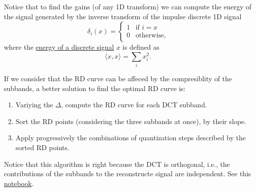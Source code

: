Notice that to find the gains (of any 1D transform) we can compute the
energy of the signal generated by the inverse transform of the impulse
discrete 1D signal
\begin{equation}
  \delta_{i}(x) = 
  \left\{
  \begin{array}{ll}
    1 & \text{if $i=x$}\\
    0 & \text{otherwise},
  \end{array}
  \right.
\end{equation}
where the
\href{https://en.wikipedia.org/wiki/Energy_(signal_processing)}{energy
  of a discrete signal} $x$ is defined as
\begin{equation}
  \langle x, x\rangle =  \sum_{i}{x_i^2}.
\end{equation}

If we consider that the RD curve can be affeced by the compresiblity of the subbands, a better solution to find the optimal RD curve is:
\begin{enumerate}
\item Variying the $\Delta$, compute the RD curve for each DCT
  subband.
\item Sort the RD points (considering the three subbands at once), by
  their slope.
\item Apply progressively the combinations of quantization steps
  described by the sorted RD points.
\end{enumerate}
Notice that this algorithm is right because the DCT is orthogonal,
i.e., the contributions of the subbands to the reconstructe signal are
independent. See this \href{https://github.com/Sistemas-Multimedia/Sistemas-Multimedia.github.io/blob/master/study_guide/06-color_transform/color-DCT_compression.ipynb}{notebook}.
  
